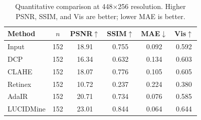 \begin{table}[t]
\centering
\caption{Quantitative comparison at 448$\times$256 resolution. Higher PSNR, SSIM, and Vis are better; lower MAE is better.}
\label{tab:comparison_lowres_448x256}
\begin{tabular}{lccccc}
\toprule
Method & $n$ & PSNR$\uparrow$ & SSIM$\uparrow$ & MAE$\downarrow$ & Vis$\uparrow$ \\
\midrule
Input & 152 & 18.91 & 0.755 & 0.092 & 0.592 \\
DCP & 152 & 16.34 & 0.632 & 0.134 & 0.603 \\
CLAHE & 152 & 18.07 & 0.776 & 0.105 & 0.605 \\
Retinex & 152 & 10.72 & 0.237 & 0.224 & 0.380 \\
AdaIR & 152 & 20.71 & 0.734 & 0.076 & 0.585 \\
LUCIDMine & 152 & 23.01 & 0.844 & 0.064 & 0.644 \\
\bottomrule
\end{tabular}
\end{table}
